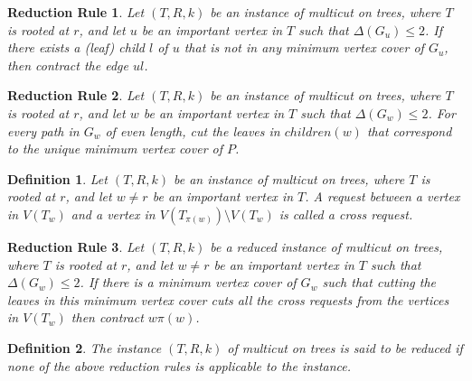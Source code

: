 \documentclass[11pt]{article}
\newtheorem{reduction}{Reduction Rule}[section]
\newtheorem{definition}{Definition}[section]
\begin{document}
\begin{reduction}\label{red:4}
Let $(T, R, k)$ be an instance of {\sc multicut on trees}, where $T$ is rooted at $r$, and let $u$ be an important vertex in $T$ such that $\Delta(G_u) \leq 2$. If there exists a (leaf) child $l$ of $u$ that is not in any minimum vertex cover of $G_u$, then contract the edge $ul$.
\end{reduction}


\begin{reduction}\label{red:5}
Let $(T, R, k)$ be an instance of {\sc multicut on trees}, where $T$ is rooted at $r$, and let $w$ be an important vertex in $T$ such that $\Delta(G_w) \leq 2$. For every path in $G_w$ of even length, cut the leaves in $children(w)$ that correspond to the unique minimum vertex cover of $P$.
\end{reduction}


\begin{definition} \rm
Let $(T, R, k)$ be an instance of {\sc multicut on trees}, where $T$ is rooted at $r$, and let $w \neq r$ be an important vertex in $T$. A request between a vertex in $V(T_w)$ and a vertex in $V(T_{\pi(w)}) \setminus V(T_w)$ is called a {\em cross request}.
\end{definition}


\begin{reduction}\label{red:6}
Let $(T, R, k)$ be a reduced instance of {\sc multicut on trees}, where $T$ is rooted at $r$, and let $w \neq r$ be an important vertex in $T$ such that $\Delta(G_w) \leq 2$. If there is a minimum vertex cover of $G_w$ such that cutting the leaves in this minimum vertex cover cuts all the cross requests from the vertices in $V(T_w)$ then contract $w\pi(w)$.
\end{reduction}


\begin{definition}\rm
\label{def:strongreduced}
The instance $(T, R, k)$ of {\sc multicut on trees} is said to be {\em reduced} if none of the above reduction rules is applicable to the instance.
\end{definition}
\end{document}
